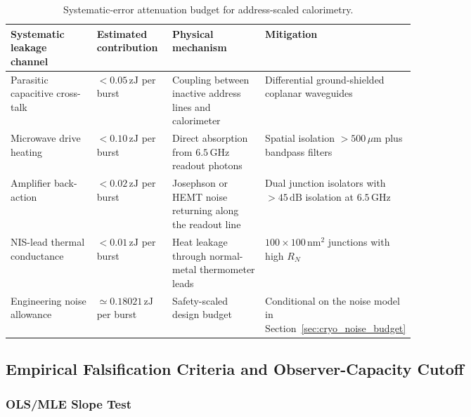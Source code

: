 \documentclass[11pt,letterpaper]{article}
\theoremstyle{plain}
\begin{document}
\begin{table}[htbp]
\centering
\scriptsize
\begin{tabularx}{\linewidth}{@{}L{0.23\linewidth}L{0.19\linewidth}L{0.25\linewidth}Y@{}}
\toprule
Systematic leakage channel & Estimated contribution & Physical mechanism & Mitigation \\
\midrule
Parasitic capacitive cross-talk & \(<0.05\,\mathrm{zJ}\) per burst & Coupling between inactive address lines and calorimeter & Differential ground-shielded coplanar waveguides \\
Microwave drive heating & \(<0.10\,\mathrm{zJ}\) per burst & Direct absorption from \(6.5\,\mathrm{GHz}\) readout photons & Spatial isolation \(>500\,\mu\mathrm{m}\) plus bandpass filters \\
Amplifier back-action & \(<0.02\,\mathrm{zJ}\) per burst & Josephson or HEMT noise returning along the readout line & Dual junction isolators with \(>45\,\mathrm{dB}\) isolation at \(6.5\,\mathrm{GHz}\) \\
NIS-lead thermal conductance & \(<0.01\,\mathrm{zJ}\) per burst & Heat leakage through normal-metal thermometer leads & \(100\times100\,\mathrm{nm}^2\) junctions with high \(R_N\) \\
Engineering noise allowance & \(\simeq0.18021\,\mathrm{zJ}\) per burst & Safety-scaled design budget & Conditional on the noise model in Section~\ref{sec:cryo_noise_budget} \\
\bottomrule
\end{tabularx}
\caption{Systematic-error attenuation budget for address-scaled calorimetry.}
\label{tab:calorimetry-systematics}
\end{table}

\subsection{Empirical Falsification Criteria and Observer-Capacity Cutoff}
\label{sec:calorimetry-falsification-cutoff}

\subsubsection{OLS/MLE Slope Test}
\end{document}

